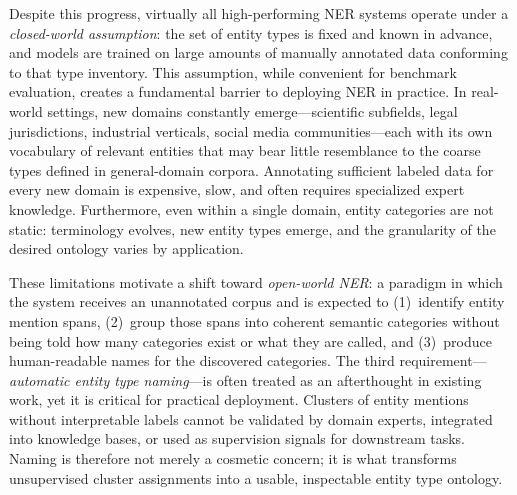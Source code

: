 \documentclass[14pt]{extreport}
\begin{document}
Despite this progress, virtually all high-performing NER systems operate under a \emph{closed-world assumption}: the set of entity types is fixed and known in advance, and models are trained on large amounts of manually annotated data conforming to that type inventory. This assumption, while convenient for benchmark evaluation, creates a fundamental barrier to deploying NER in practice. In real-world settings, new domains constantly emerge---scientific subfields, legal jurisdictions, industrial verticals, social media communities---each with its own vocabulary of relevant entities that may bear little resemblance to the coarse types defined in general-domain corpora. Annotating sufficient labeled data for every new domain is expensive, slow, and often requires specialized expert knowledge. Furthermore, even within a single domain, entity categories are not static: terminology evolves, new entity types emerge, and the granularity of the desired ontology varies by application.

These limitations motivate a shift toward \emph{open-world NER}: a paradigm in which the system receives an unannotated corpus and is expected to (1)~identify entity mention spans, (2)~group those spans into coherent semantic categories without being told how many categories exist or what they are called, and (3)~produce human-readable names for the discovered categories. The third requirement---\emph{automatic entity type naming}---is often treated as an afterthought in existing work, yet it is critical for practical deployment. Clusters of entity mentions without interpretable labels cannot be validated by domain experts, integrated into knowledge bases, or used as supervision signals for downstream tasks. Naming is therefore not merely a cosmetic concern; it is what transforms unsupervised cluster assignments into a usable, inspectable entity type ontology.
\end{document}
